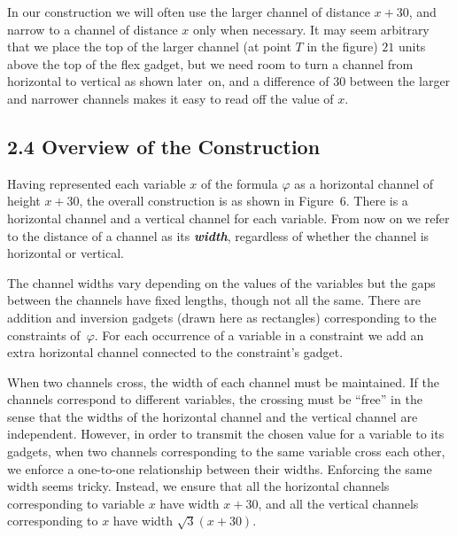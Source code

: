 \documentclass{article}
\newcommand{\defn}[1]{\textit{\textbf{\boldmath #1}}}
\begin{document}
In our construction we will often use the larger channel of distance $x + 30$, and narrow to a channel of distance $x$ only when necessary. 
It may seem arbitrary that we place the top of the larger channel (at point $T$ in the figure) $21$ units above the top of the flex gadget,  
but we need room to
turn a channel from horizontal to vertical as shown later~on, and a difference of $30$ between the larger and narrower channels makes it easy to read off the value of $x$.

\subsection*{2.4 Overview of the Construction}

Having represented each variable $x$ of the formula $\varphi$ as a horizontal channel of height $x + 30$, the overall construction is as shown in Figure~6. 
There is a horizontal channel 
and a vertical channel 
for each variable.
From now on we refer to the distance of a channel as its \defn{width}, regardless of whether 
the channel is horizontal or vertical.

The channel widths vary depending on the values of the variables but the gaps between the channels have fixed lengths, though not all the same. 
There are addition and inversion gadgets (drawn here as rectangles) corresponding to the constraints
of~$\varphi$.
For each occurrence of a variable in a constraint we add an extra 
horizontal channel connected to the constraint's gadget.
  
When two channels cross, the width of each channel must be maintained.  If the channels correspond to different variables, the crossing must be ``free'' in the sense that the widths of the horizontal channel and the vertical channel are independent.  
However, in order to transmit the chosen value for a variable to its gadgets, when two channels corresponding to the same variable cross each other, we enforce a one-to-one relationship between their widths.  Enforcing the same width seems tricky.  Instead, we ensure that all the horizontal channels corresponding to variable $x$ have width $x + 30$, and all the vertical channels corresponding to  $x$ have width $\sqrt{3}(x+30)$.   
\end{document}
